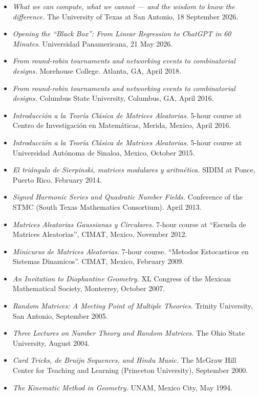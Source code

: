 \documentclass[11pt,a4paper,ragged2e,withhyper]{altacv}
\begin{document}
{\footnotesize
\begin{itemize}
\item\emph{What we can compute, what we cannot — and the wisdom to know the difference.} The University of Texas at San Antonio, 18 September 2026.
\item\emph{Opening the ``Black Box'': From Linear Regression to ChatGPT in 60 Minutes.} Universidad Panamericana, 21 May 2026.
\item\emph{From round-robin tournaments and networking events to combinatorial designs.} Morehouse College. Atlanta, GA, April 2018.
\item\emph{From round-robin tournaments and networking events to combinatorial designs.} Columbus State University, Columbus, GA, April 2016.
\item\emph{Introducción a la Teoría Clásica de Matrices Aleatorias.} 5-hour course at Centro de Investigación en Matemáticas, Merida, Mexico, April 2016.
\item\emph{Introducción a la Teoría Clásica de Matrices Aleatorias.} 5-hour course at Universidad Autónoma de Sinaloa, Mexico, October 2015.
\item\emph{El triángulo de Sierpinski, matrices modulares y aritmética.} SIDIM at Ponce, Puerto Rico. February 2014.
\item\emph{Signed Harmonic Series and Quadratic Number Fields.} Conference of the STMC (South Texas Mathematics Consortium). April 2013.
\item\emph{Matrices Aleatorias Gaussianas y Circulares.} 7-hour course at ``Escuela de Matrices Aleatorias'', CIMAT, Mexico, November 2012.
\item\emph{Minicurso de Matrices Aleatorias.} 7-hour course. ``Metodos Estocasticos en Sistemas Dinamicos''. CIMAT, Mexico, February 2009.
\item\emph{An Invitation to Diophantine Geometry.} XL Congress of the Mexican Mathematical Society, Monterrey, October 2007.
\item\emph{Random Matrices: A Meeting Point of Multiple Theories.} Trinity University, San Antonio, September 2005.
\item\emph{Three Lectures on Number Theory and Random Matrices.} The Ohio State University, August 2004.
\item\emph{Card Tricks, de Bruijn Sequences, and Hindu Music.} The McGraw Hill Center for Teaching and Learning (Princeton University), September 2000.
\item\emph{The Kinematic Method in Geometry.} UNAM, Mexico City, May 1994.
\end{itemize}
}
\end{document}
